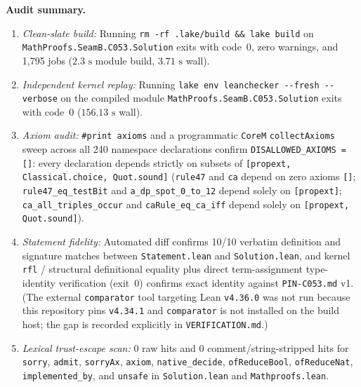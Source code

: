 \documentclass[11pt]{article}
\theoremstyle{definition}
\begin{document}
\noindent\textbf{Audit summary.}
\begin{enumerate}\setlength{\itemsep}{2pt}
\item \emph{Clean-slate build:} Running \texttt{rm -rf .lake/build \&\& lake build} on \nolinkurl{MathProofs.SeamB.C053.Solution} exits with code~$0$, zero warnings, and 1{,}795 jobs ($2.3\text{ s}$ module build, $3.71\text{ s}$ wall).
\item \emph{Independent kernel replay:} Running \texttt{lake env leanchecker -{}-fresh -{}-verbose} on the compiled module \nolinkurl{MathProofs.SeamB.C053.Solution} exits with code~$0$ ($156.13\text{ s}$ wall).
\item \emph{Axiom audit:} \texttt{\#print axioms} and a programmatic \texttt{CoreM} \texttt{collectAxioms} sweep across all 240 namespace declarations confirm \texttt{DISALLOWED\_AXIOMS = []}: every declaration depends strictly on subsets of \texttt{[propext, Classical.choice, Quot.sound]} (\texttt{rule47} and \texttt{ca} depend on zero axioms \texttt{[]}; \texttt{rule47\_eq\_testBit} and \texttt{a\_dp\_spot\_0\_to\_12} depend solely on \texttt{[propext]}; \texttt{ca\_all\_triples\_occur} and \texttt{caRule\_eq\_ca\_iff} depend solely on \texttt{[propext, Quot.sound]}).
\item \emph{Statement fidelity:} Automated diff confirms 10/10 verbatim definition and signature matches between \texttt{Statement.lean} and \texttt{Solution.lean}, and kernel \texttt{rfl} / structural definitional equality plus direct term-assignment type-identity verification (exit~$0$) confirms exact identity against \texttt{PIN-C053.md} v1. (The external \texttt{comparator} tool targeting Lean \texttt{v4.36.0} was not run because this repository pins \texttt{v4.34.1} and \texttt{comparator} is not installed on the build host; the gap is recorded explicitly in \texttt{VERIFICATION.md}.)
\item \emph{Lexical trust-escape scan:} $0$ raw hits and $0$ comment/string-stripped hits for \texttt{sorry}, \texttt{admit}, \texttt{sorryAx}, \texttt{axiom}, \texttt{native\_decide}, \texttt{ofReduceBool}, \texttt{ofReduceNat}, \texttt{implemented\_by}, and \texttt{unsafe} in \texttt{Solution.lean} and \texttt{Mathproofs.lean}.
\end{enumerate}
\end{document}
